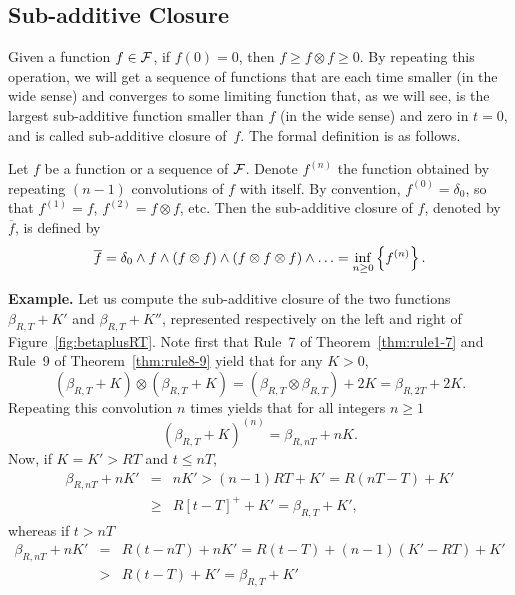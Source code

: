 \subsection{Sub-additive Closure}

Given a function $f \in \cal F$, if $f(0) = 0$, then $f \geq f
\otimes f \geq 0$. By repeating this operation, we will get a
sequence of functions that are each time smaller (in the wide sense) and converges to
some limiting function that, as we will see, is the largest
sub-additive function smaller than $f$ (in the wide sense) and zero in $t=0$, and is
called sub-additive closure of~$f$. The formal definition is as
follows.
\begin{definition}
Let $f$ be a function or a sequence of $\mathcal F$. Denote $f^{(n)}$ the function obtained
by repeating $(n-1)$ convolutions of $f$ with itself. By convention, $f^{(0)} = \delta_0$,
so that $f^{(1)} = f$, $f^{(2)} = f \otimes f$, etc.
Then the sub-additive closure of $f$,  denoted by $\overline{f}$, is defined by
\begin{equation}
\mylabel{eq:sub-additiveclosure}
\overline{f} = \delta_0 \wedge f \wedge (f \otimes f) \wedge (f \otimes f \otimes f) \wedge \ldots = \inf_{n \geq 0} \left\{ f^{(n)} \right\}.
\end{equation}
\end{definition}
\noindent
{\bf Example.} Let us compute the sub-additive closure of the two functions $\beta_{R,T} + K'$ and $\beta_{R,T} + K''$, represented respectively on the left and right
of Figure~\ref{fig:betaplusRT}. Note first that Rule~7 of Theorem~\ref{thm:rule1-7} and
Rule~9 of Theorem~\ref{thm:rule8-9}  yield that for any $K > 0$,
$$ (\beta_{R,T} + K) \otimes (\beta_{R,T} + K) = ( \beta_{R,T} \otimes \beta_{R,T}) + 2K = \beta_{R,2T} + 2K.$$
Repeating this convolution $n$ times yields that for all integers $n \geq 1$
$$ (\beta_{R,T} + K)^{(n)} = \beta_{R,nT} + nK . $$
Now, if $K = K' > RT$ and $t \leq nT$,
\begin{eqnarray*}
 \beta_{R,nT} + nK' & = & nK' > (n-1)RT + K' = R(nT - T) + K' \\
        & \geq & R[t-T]^{+} + K' = \beta_{R,T} + K',
 \end{eqnarray*}
whereas if $t > nT$
\begin{eqnarray*}
 \beta_{R,nT} + nK' &  =  & R(t-nT) + nK' = R(t-T) + (n-1)(K'-RT) + K' \\
        & > &  R(t-T) + K' =  \beta_{R,T} + K'
 \end{eqnarray*}
